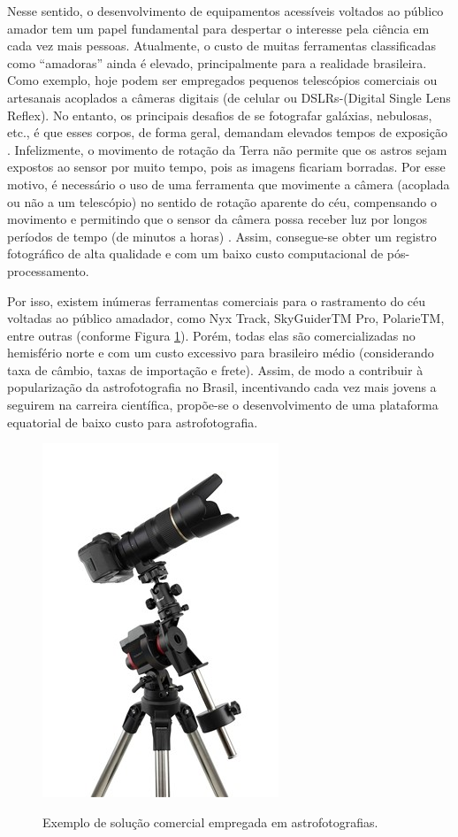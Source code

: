 Nesse sentido, o desenvolvimento de equipamentos acessíveis voltados ao público amador tem um papel fundamental para despertar o interesse pela ciência em cada vez mais pessoas. Atualmente, o custo de muitas ferramentas classificadas como “amadoras” ainda é elevado, principalmente para a realidade brasileira. Como exemplo, hoje podem ser empregados pequenos telescópios comerciais ou artesanais acoplados a câmeras digitais (de celular ou DSLRs-(Digital Single Lens Reflex). No entanto, os principais desafios de se fotografar galáxias, nebulosas, etc., é que esses corpos, de forma geral, demandam elevados tempos de exposição \cite{site:introCabau}. Infelizmente, o movimento de rotação da Terra não permite que os astros sejam expostos ao sensor por muito tempo, pois as imagens ficariam borradas. Por esse motivo, é necessário o uso de uma ferramenta que movimente a câmera (acoplada ou não a um telescópio) no sentido de rotação aparente do céu, compensando o movimento e permitindo que o sensor da câmera possa receber luz por longos períodos de tempo (de minutos a horas) \cite{site:introCabau}. Assim, consegue-se obter um registro fotográfico de alta qualidade e com um baixo custo computacional de pós-processamento.


Por isso, existem inúmeras ferramentas comerciais para o rastramento do céu voltadas ao público amadador, como Nyx Track, SkyGuiderTM Pro, PolarieTM, entre outras (conforme Figura \ref{fig:skyguider}). Porém, todas elas são comercializadas no hemisfério norte e com um custo excessivo para brasileiro médio (considerando taxa de câmbio, taxas de importação e frete). Assim, de modo a contribuir à popularização da astrofotografia no Brasil, incentivando cada vez mais jovens a seguirem na carreira científica, propõe-se o desenvolvimento de uma plataforma equatorial de baixo custo para astrofotografia.


\begin{figure}[htb]
	\centering
	\caption{Exemplo de solução comercial empregada em astrofotografias. }
	\includegraphics[width=0.3\linewidth]{figuras/skyguider}
	\label{fig:skyguider}
\end{figure}
